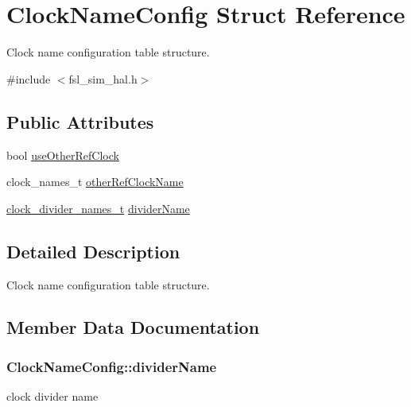 \hypertarget{structClockNameConfig}{}\section{Clock\+Name\+Config Struct Reference}
\label{structClockNameConfig}


Clock name configuration table structure.  




{\ttfamily \#include $<$fsl\+\_\+sim\+\_\+hal.\+h$>$}

\subsection*{Public Attributes}
\begin{DoxyCompactItemize}
\item 
bool \hyperlink{structClockNameConfig_a5bee173b4b267afb9c0f752417728cdc}{use\+Other\+Ref\+Clock}
\item 
clock\+\_\+names\+\_\+t \hyperlink{structClockNameConfig_a12d858bf0eb237aff5836b3c45157237}{other\+Ref\+Clock\+Name}
\item 
\hyperlink{group__sim__hal_ga51a225b8eb0e0d00e7911b3603d7caa2}{clock\+\_\+divider\+\_\+names\+\_\+t} \hyperlink{structClockNameConfig_a365617b29f3d6bfb0a8998fd5f468398}{divider\+Name}
\end{DoxyCompactItemize}


\subsection{Detailed Description}
Clock name configuration table structure. 

\subsection{Member Data Documentation}
\subsubsection[{\texorpdfstring{divider\+Name}{dividerName}}]{ Clock\+Name\+Config\+::divider\+Name}\hypertarget{structClockNameConfig_a365617b29f3d6bfb0a8998fd5f468398}{}\label{structClockNameConfig_a365617b29f3d6bfb0a8998fd5f468398}
clock divider name 
